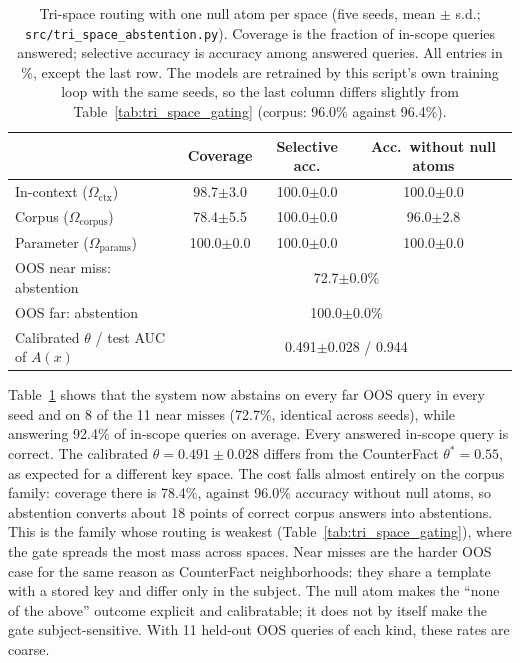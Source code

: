 \documentclass[preprint,12pt]{elsarticle}
\newcommand{\Om}{\Omega}
\newif\ifmarkchanges
\newcommand{\revii}[1]{\ifmarkchanges{\color{blue}#1}\else#1\fi} %
\providecommand{\DIFaddbeginFL}{} %
\providecommand{\DIFaddendFL}{} %
\providecommand{\DIFaddincludegraphics}[2][]{{\color{blue}\fbox{\DIFOincludegraphics[#1]{#2}}}} %
\DeclareRobustCommand{\DIFaddbeginFL}{\DIFOaddbeginFL \let\includegraphics\DIFaddincludegraphics} %
\DeclareRobustCommand{\DIFaddendFL}{\DIFOaddendFL \let\includegraphics\DIFOincludegraphics} %
\begin{document}
\begin{table}[t]
\centering
\caption{Tri-space routing with one null atom per space (five seeds, mean $\pm$ s.d.; \texttt{src/tri\_space\_abstention.py}). Coverage is the fraction of in-scope queries answered; selective accuracy is accuracy among answered queries. All entries in \%, except the last row. \DIFaddbeginFL \revii{The models are retrained by this script's own training loop with the same seeds, so the last column differs slightly from Table~\ref{tab:tri_space_gating} (corpus: 96.0\% against 96.4\%).}\DIFaddendFL }
\label{tab:abstention}
\vspace{0.5em}
\footnotesize
\begin{tabular}{@{}lccc@{}}
\toprule
 & Coverage & Selective acc. & Acc.\ without null atoms \\
\midrule
In-context ($\Om_{\mathrm{ctx}}$) & 98.7$\pm$3.0 & 100.0$\pm$0.0 & 100.0$\pm$0.0 \\
Corpus ($\Om_{\mathrm{corpus}}$) & 78.4$\pm$5.5 & 100.0$\pm$0.0 & 96.0$\pm$2.8 \\
Parameter ($\Om_{\mathrm{params}}$) & 100.0$\pm$0.0 & 100.0$\pm$0.0 & 100.0$\pm$0.0 \\
\midrule
OOS near miss: abstention & \multicolumn{3}{c}{72.7$\pm$0.0\%} \\
OOS far: abstention & \multicolumn{3}{c}{100.0$\pm$0.0\%} \\
Calibrated $\theta$ / test AUC of $A(x)$ & \multicolumn{3}{c}{0.491$\pm$0.028 / 0.944} \\
\bottomrule
\end{tabular}
\end{table}

Table~\ref{tab:abstention} shows that the system now abstains on every far OOS query in every seed and on 8 of the 11 near misses (72.7\%, identical across seeds), while answering 92.4\% of in-scope queries on average. Every answered in-scope query is correct. The calibrated $\theta=0.491\pm0.028$ differs from the CounterFact $\theta^*=0.55$, as expected for a different key space. The cost falls almost entirely on the corpus family: coverage there is 78.4\%, against 96.0\% accuracy without null atoms, so abstention converts about 18 points of correct corpus answers into abstentions. This is the family whose routing is weakest (Table~\ref{tab:tri_space_gating}), where the gate spreads the most mass across spaces. Near misses are the harder OOS case for the same reason as CounterFact neighborhoods: they share a template with a stored key and differ only in the subject. The null atom makes the ``none of the above'' outcome explicit and calibratable; it does not by itself make the gate subject-sensitive. With 11 held-out OOS queries of each kind, these rates are coarse.
\end{document}
